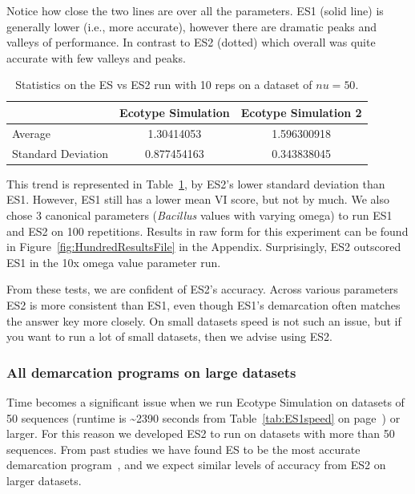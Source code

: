 Notice how close the two lines are over all the parameters.
ES1 (solid line) is generally lower (i.e., more accurate), however there are dramatic peaks and valleys of performance.
In contrast to ES2 (dotted) which overall was quite accurate with few valleys and peaks.
\begin{table}
    \begin{tabular}{l|cc}
    ~                  & Ecotype Simulation & Ecotype Simulation 2 \\ \hline
    Average            & 1.30414053         & 1.596300918          \\
    Standard Deviation & 0.877454163        & 0.343838045          \\
    \end{tabular}
    \caption[ES versus ES2 statistics.]{Statistics on the ES vs ES2 run with 10 reps on a dataset of $nu=50$.}
    \label{tab:ESvES2mean}
\end{table}
This trend is represented in Table~\ref{tab:ESvES2mean}, by ES2's lower standard deviation than ES1.
However, ES1 still has a lower mean VI score, but not by much.
We also chose 3 canonical parameters (\emph{Bacillus} values with varying omega) to run ES1 and ES2 on 100 repetitions.
Results in raw form for this experiment can be found in Figure~\ref{fig:HundredResultsFile} in the Appendix.
Surprisingly, ES2 outscored ES1 in the 10x omega value parameter run.

From these tests, we are confident of ES2's accuracy.
Across various parameters ES2 is more consistent than ES1, even though ES1's demarcation often matches the answer key more closely.
On small datasets speed is not such an issue, but if you want to run a lot of small datasets, then we advise using ES2.

\subsubsection*{All demarcation programs on large datasets}
Time becomes a significant issue when we run Ecotype Simulation on datasets of 50 sequences (runtime is \textasciitilde2390 seconds from Table~\ref{tab:ES1speed} on page~\pageref{tab:ES1speed}) or larger.
For this reason we developed ES2 to run on datasets with more than 50 sequences.
From past studies we have found ES to be the most accurate demarcation program~\cite{carlo}, and we expect similar levels of accuracy from ES2 on larger datasets.


